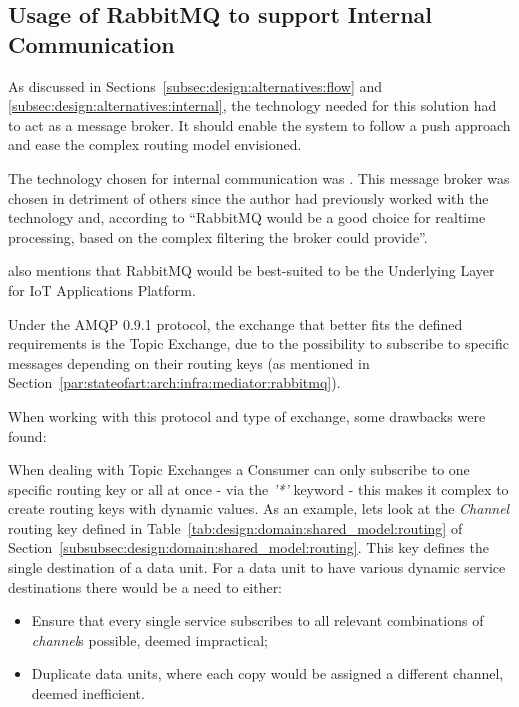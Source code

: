 \subsection{Usage of RabbitMQ to support Internal Communication}
\label{subsec:implementation:decisions:rabbitmq}

As discussed in Sections~\ref{subsec:design:alternatives:flow} and \ref{subsec:design:alternatives:internal}, the technology needed for this solution had to act as a message broker. It should enable the system to follow a push approach and ease the complex routing model envisioned.

The technology chosen for internal communication was . This message broker was chosen in detriment of others since the author had previously worked with the technology and, according to \cite{10.1145/3093742.3093908} ``RabbitMQ would be a good choice for realtime processing, based on the complex filtering the broker could provide''.

\cite{10.1145/3093742.3093908} also mentions that RabbitMQ would be best-suited to be the Underlying Layer for IoT Applications Platform.

Under the \gls{AMQP} 0.9.1 protocol, the exchange that better fits the defined requirements is the Topic Exchange, due to the possibility to subscribe to specific messages depending on their routing keys (as mentioned in Section~\ref{par:stateofart:arch:infra:mediator:rabbitmq}).

When working with this protocol and type of exchange, some drawbacks were found:

When dealing with Topic Exchanges a Consumer can only subscribe to one specific routing key or all at once - via the \textit{'*'} keyword - this makes it complex to create routing keys with dynamic values. As an example, lets look at the \textit{Channel} routing key defined in Table~\ref{tab:design:domain:shared_model:routing} of Section~\ref{subsubsec:design:domain:shared_model:routing}. This key defines the single destination of a data unit. For a data unit to have various dynamic service destinations there would be a need to either:

\begin{itemize}
    \item Ensure that every single service subscribes to all relevant combinations of \textit{channel}s possible, deemed impractical;
    \item Duplicate data units, where each copy would be assigned a different channel, deemed inefficient.
\end{itemize}

